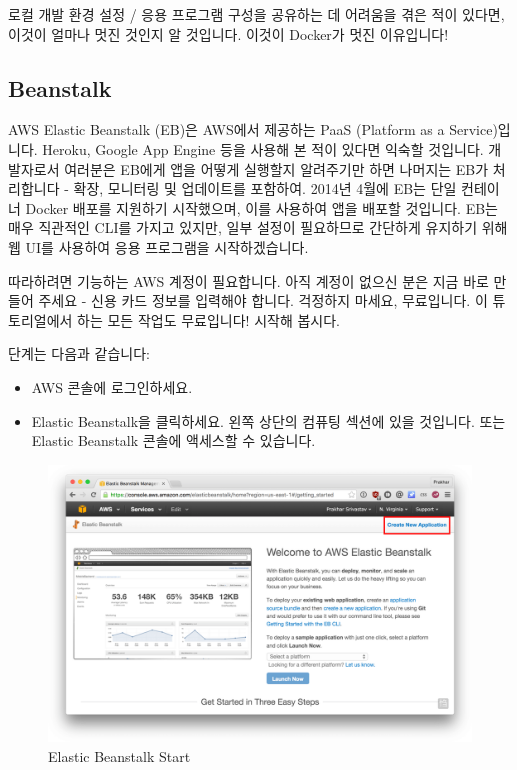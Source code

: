 로컬 개발 환경 설정 / 응용 프로그램 구성을 공유하는 데 어려움을 겪은 적이 있다면, 이것이 얼마나 멋진 것인지 알 것입니다. 이것이 Docker가 멋진 이유입니다!

\subsection{Beanstalk}
AWS Elastic Beanstalk (EB)은 AWS에서 제공하는 PaaS (Platform as a Service)입니다. Heroku, Google App Engine 등을 사용해 본 적이 있다면 익숙할 것입니다. 개발자로서 여러분은 EB에게 앱을 어떻게 실행할지 알려주기만 하면 나머지는 EB가 처리합니다 - 확장, 모니터링 및 업데이트를 포함하여. 2014년 4월에 EB는 단일 컨테이너 Docker 배포를 지원하기 시작했으며, 이를 사용하여 앱을 배포할 것입니다. EB는 매우 직관적인 CLI를 가지고 있지만, 일부 설정이 필요하므로 간단하게 유지하기 위해 웹 UI를 사용하여 응용 프로그램을 시작하겠습니다.

따라하려면 기능하는 AWS 계정이 필요합니다. 아직 계정이 없으신 분은 지금 바로 만들어 주세요 - 신용 카드 정보를 입력해야 합니다. 걱정하지 마세요, 무료입니다. 이 튜토리얼에서 하는 모든 작업도 무료입니다! 시작해 봅시다.

단계는 다음과 같습니다:
\begin{itemize}
    \item AWS 콘솔에 로그인하세요.
    \item Elastic Beanstalk을 클릭하세요. 왼쪽 상단의 컴퓨팅 섹션에 있을 것입니다. 또는 Elastic Beanstalk 콘솔에 액세스할 수 있습니다.
\end{itemize}

\begin{figure}
\includegraphics[width=\textwidth]{images/eb-start.png}
\caption{Elastic Beanstalk Start}
\label{fig:eb-start}
\end{figure}


